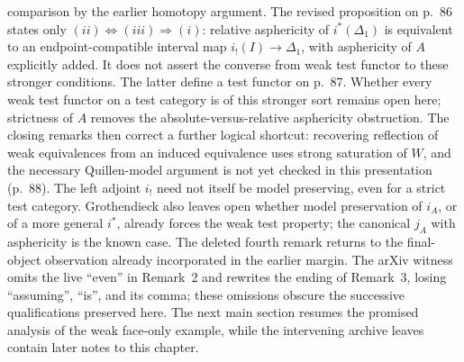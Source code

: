 comparison by the earlier homotopy argument. The revised proposition on p.~86 states only $(ii)\Leftrightarrow(iii)\Rightarrow(i)$: relative asphericity of $i^*(\Delta_1)$ is equivalent to an endpoint-compatible interval map $i_!(I)\to\Delta_1$, with asphericity of $A$ explicitly added. It does not assert the converse from weak test functor to these stronger conditions. The latter define a test functor on p.~87. Whether every weak test functor on a test category is of this stronger sort remains open here; strictness of $A$ removes the absolute-versus-relative asphericity obstruction. The closing remarks then correct a further logical shortcut: recovering reflection of weak equivalences from an induced equivalence uses strong saturation of $W$, and the necessary Quillen-model argument is not yet checked in this presentation (p.~88). The left adjoint $i_!$ need not itself be model preserving, even for a strict test category. Grothendieck also leaves open whether model preservation of $i_A$, or of a more general $i^*$, already forces the weak test property; the canonical $j_A$ with asphericity is the known case. The deleted fourth remark returns to the final-object observation already incorporated in the earlier margin. The arXiv witness omits the live ``even'' in Remark~2 and rewrites the ending of Remark~3, losing ``assuming'', ``is'', and its comma; these omissions obscure the successive qualifications preserved here. The next main section resumes the promised analysis of the weak face-only example, while the intervening archive leaves contain later notes to this chapter.
